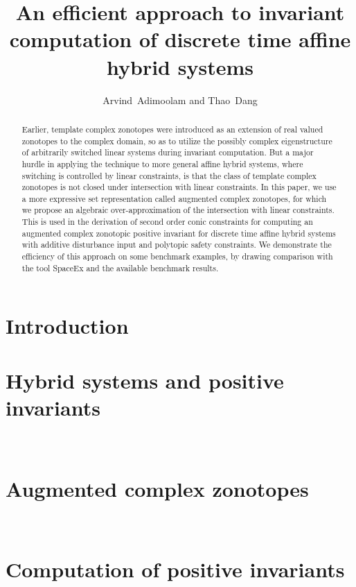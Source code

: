 \documentclass{llncs}
\title{An efficient approach to invariant computation of discrete time affine hybrid systems
}
\author{Arvind\ Adimoolam and Thao\ Dang
}
\institute{\ Verimag,~Grenoble, France\\ \url{{santosh.adimoolam,thao.dang}@univ-grenoble-alpes.fr}.
}
\begin{document}
\maketitle

\begin{abstract}
Earlier, template complex zonotopes were introduced as an
extension of real valued zonotopes to the complex domain, so as to
utilize the possibly complex eigenstructure of arbitrarily switched
linear systems during invariant computation.  But a major hurdle in
applying the technique to more general affine hybrid systems, where
switching is controlled by linear constraints, is that the class of
template complex zonotopes is not closed under intersection with
linear constraints.  In this paper, we use a more expressive set
representation called augmented complex zonotopes, for which we
propose an algebraic over-approximation of the intersection with
linear constraints.  This is used in the derivation of second order
conic constraints for computing an augmented complex zonotopic
positive invariant for discrete time affine hybrid systems with
additive disturbance input and polytopic safety constraints.  We
demonstrate the efficiency of this approach on some benchmark
examples, by drawing comparison with the tool SpaceEx and the
available benchmark results.
\end{abstract}

\section{Introduction}


\section{Hybrid systems and positive invariants}~\label{sec:system}




\section{Augmented complex zonotopes}~\label{sec:acz}




\section{Computation of positive invariants}~\label{sec:invcomp}

\end{document}

